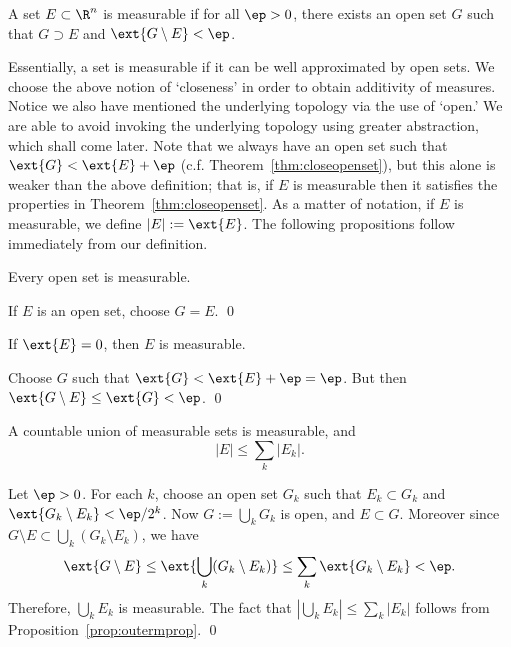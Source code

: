 \begin{dfn}[Measurable]
A set $E \subset \R^n$ is measurable if for all $\ep>0$, there exists an open set $G$ such that $G \supset E$ and $\ext{G \setminus E} < \ep$.
\end{dfn}

Essentially, a set is measurable if it can be well approximated by open sets. We choose the above notion of `closeness' in order to obtain additivity of measures. Notice we also have mentioned the underlying topology via the use of `open.' We are able to avoid invoking the underlying topology using greater abstraction, which shall come later. Note that we always have an open set such that $\ext{G} < \ext{E}+\ep$ (c.f. Theorem~\ref{thm:closeopenset}), but this alone is weaker than the above definition; that is, if $E$ is measurable then it satisfies the properties in Theorem~\ref{thm:closeopenset}. As a matter of notation, if $E$ is measurable, we define $|E|:= \ext{E}$. The following propositions follow immediately from our definition.

\begin{prop} \label{prop:openmeasurable}
Every open set is measurable.
\end{prop}

\pf If $E$ is an open set, choose $G=E$. \qed \\


\begin{prop} \label{prop:zeromeasurable}
If $\ext{E}=0$, then $E$ is measurable. 
\end{prop}

\pf Choose $G$ such that $\ext{G}<\ext{E}+\ep=\ep$. But then $\ext{G \setminus E} \leq \ext{G}<\ep$. \qed \\

\begin{prop}
A countable union of measurable sets is measurable, and 
	\[
	|E| \leq \sum_k |E_k|.
	\]
\end{prop}

\pf Let $\ep>0$. For each $k$, choose an open set $G_k$ such that $E_k \subset G_k$ and $\ext{G_k\setminus E_k}< \ep/2^k$. Now $G:= \bigcup_k G_k$ is open, and $E \subset G$. Moreover since $G \setminus E \subset \bigcup_k (G_k \setminus E_k)$, we have
	\[
	\ext{G\setminus E} \leq \ext{\bigcup_k (G_k \setminus E_k)} \leq \sum_k \ext{G_k \setminus E_k}< \ep.
	\]
Therefore, $\bigcup_k E_k$ is measurable. The fact that $\left|\bigcup_k E_k\right| \leq \sum_k |E_k|$ follows from Proposition~\ref{prop:outermprop}. \qed \\

